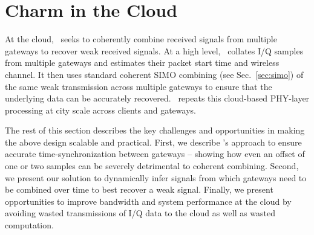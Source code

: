 \section{Charm in the Cloud}
\label{sec:cloud}


At the cloud, \name\ seeks to coherently combine received signals from multiple gateways to recover weak received signals. At a high level, \name\ collates I/Q samples from multiple gateways and estimates their packet start time and wireless channel. It then uses standard coherent SIMO combining (see Sec.~\ref{sec:simo}) of the same weak transmission across multiple gateways to ensure that the underlying data can be accurately recovered. \name\ repeats this cloud-based PHY-layer processing at city scale across clients and gateways. 

The rest of this section describes the key challenges and opportunities in making the above design scalable and practical. First, we describe \name's approach to ensure accurate time-synchronization between gateways -- showing how even an offset of one or two samples can be severely detrimental to coherent combining. Second, we present our solution to dynamically infer signals from which gateways need to be combined over time to best recover a weak signal. Finally, we present opportunities to improve bandwidth and system performance at the cloud by avoiding wasted transmissions of I/Q data to the cloud as well as wasted computation.



